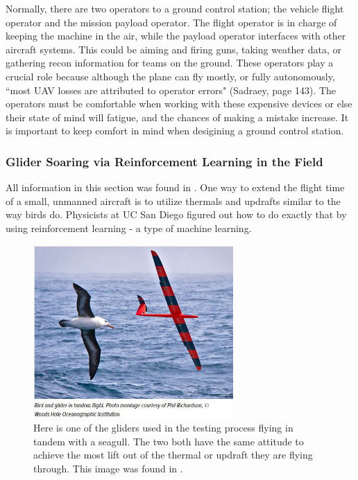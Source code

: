 \documentclass[12pt,journal,compsoc]{IEEEtran}
\begin{document}
Normally, there are two operators to a ground control station; the vehicle flight operator and the mission payload operator. The flight operator is in charge of keeping the machine in the air, while the payload operator interfaces with other aircraft systems. This could be aiming and firing guns, taking weather data, or gathering recon information for teams on the ground. These operators play a crucial role because although the plane can fly mostly, or fully autonomously, ``most UAV losses are attributed to operator errors" (Sadraey, page 143). The operators must be comfortable when working with these expensive devices or else their state of mind will fatigue, and the chances of making a mistake increase. It is important to keep comfort in mind when desigining a ground control station.

\subsubsection{Glider Soaring via Reinforcement Learning in the Field}
All information in this section was found in \cite{GliderBirds}. One way to extend the flight time of a small, unmanned aircraft is to utilize thermals and updrafts similar to the way birds do. Physicists at UC San Diego figured out how to do exactly that by using reinforcement learning - a type of machine learning.
\begin{figure}[h!]
\hspace*{0cm}
\centering
\includegraphics[width=3in]{gliderAndBird.jpg}
\caption{Here is one of the gliders used in the testing process flying in tandem with a seagull. The two both have the same attitude to achieve the most lift out of the thermal or updraft they are flying through. This image was found in \cite{gbArticle}.}
\label{gliderAndBird}
\end{figure}
\end{document}
